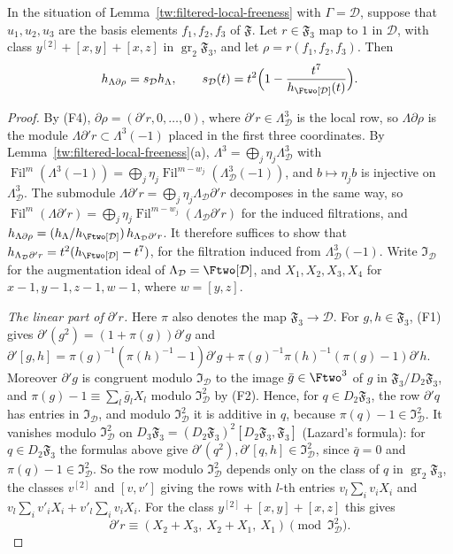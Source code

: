 \begin{lemma}\label{tw:local-fox}
In the situation of Lemma~\ref{tw:filtered-local-freeness} with $\Gamma=\mathcal D$,
suppose that $u_1,u_2,u_3$ are the basis elements $f_1,f_2,f_3$ of
$\mathfrak F$. Let $r\in\mathfrak F_3$ map to $1$ in $\mathcal D$, with class
$y^{[2]}+[x,y]+[x,z]$ in $\operatorname{gr}_2\mathfrak F_3$, and let
$\rho=r(f_1,f_2,f_3)$. Then
\[
 h_{\Lambda\partial\rho}=s_{\mathcal D}h_\Lambda,\qquad
 s_{\mathcal D}(t)=t^2\Bigl(1-\frac{t^7}{h_{\Ftwo[\mathcal D]}(t)}\Bigr).
\]
\end{lemma}

\begin{proof}
By (F4), $\partial\rho=(\partial'r,0,\dots,0)$, where
$\partial'r\in\Lambda_{\mathcal D}^3$ is the local row, so $\Lambda\partial\rho$ is the
module $\Lambda\partial'r\subset\Lambda^3(-1)$ placed in the first three
coordinates. By Lemma~\ref{tw:filtered-local-freeness}(a),
$\Lambda^3=\bigoplus_j\eta_j\Lambda_{\mathcal D}^3$ with
$\operatorname{Fil}^m(\Lambda^3(-1))=\bigoplus_j\eta_j\operatorname{Fil}^{m-w_j}(\Lambda_{\mathcal D}^3(-1))$,
and
$b\mapsto\eta_jb$ is injective on $\Lambda_{\mathcal D}^3$. The submodule
$\Lambda\partial'r=\bigoplus_j\eta_j\Lambda_{\mathcal D}\partial'r$ decomposes in the
same way, so
$\operatorname{Fil}^m(\Lambda\partial'r)=\bigoplus_j\eta_j\operatorname{Fil}^{m-w_j}(\Lambda_{\mathcal D}\partial'r)$
for
the induced filtrations, and
$h_{\Lambda\partial\rho}=(h_\Lambda/h_{\Ftwo[\mathcal D]})\,h_{\Lambda_{\mathcal D}\partial'r}$. It
therefore suffices to show that $h_{\Lambda_{\mathcal D}\partial'r}=t^2(h_{\Ftwo[\mathcal D]}-t^7)$, for
the filtration induced from $\Lambda_{\mathcal D}^3(-1)$. Write $\mathfrak I_{\mathcal D}$ for the augmentation ideal of
$\Lambda_{\mathcal D}=\Ftwo[\mathcal D]$, and $X_1,X_2,X_3,X_4$ for $x-1,y-1,z-1,w-1$, where
$w=[y,z]$.

\emph{The linear part of $\partial'r$.} Here $\pi$ also denotes the map
$\mathfrak F_3\to \mathcal D$. For $g,h\in\mathfrak F_3$, (F1) gives
$\partial'(g^2)=(1+\pi(g))\partial'g$ and
$\partial'[g,h]=\pi(g)^{-1}(\pi(h)^{-1}-1)\partial'g+\pi(g)^{-1}\pi(h)^{-1}(\pi(g)-1)\partial'h$.
Moreover $\partial'g$ is congruent modulo $\mathfrak I_{\mathcal D}$ to the image
$\bar g\in\Ftwo^3$ of $g$ in $\mathfrak F_3/D_2\mathfrak F_3$, and
$\pi(g)-1\equiv\sum_l\bar g_lX_l$ modulo $\mathfrak I_{\mathcal D}^2$ by (F2). Hence, for
$q\in D_2\mathfrak F_3$, the row $\partial'q$ has entries in $\mathfrak I_{\mathcal D}$,
and modulo $\mathfrak I_{\mathcal D}^2$ it is additive in $q$, because
$\pi(q)-1\in\mathfrak I_{\mathcal D}^2$. It vanishes modulo $\mathfrak I_{\mathcal D}^2$ on
$D_3\mathfrak F_3=(D_2\mathfrak F_3)^2[D_2\mathfrak F_3,\mathfrak F_3]$ (Lazard's
formula): for $q\in D_2\mathfrak F_3$ the formulas above give
$\partial'(q^2),\partial'[q,h]\in\mathfrak I_{\mathcal D}^2$, since $\bar q=0$ and
$\pi(q)-1\in\mathfrak I_{\mathcal D}^2$. So the row modulo $\mathfrak I_{\mathcal D}^2$ depends
only on the class of $q$ in $\operatorname{gr}_2\mathfrak F_3$, the classes
$v^{[2]}$ and $[v,v']$ giving the rows with $l$-th entries $v_l\sum_iv_iX_i$
and $v_l\sum_iv'_iX_i+v'_l\sum_iv_iX_i$.
For the class $y^{[2]}+[x,y]+[x,z]$ this gives
\[
 \partial'r\equiv(X_2+X_3,\ X_2+X_1,\ X_1)\pmod{\mathfrak I_{\mathcal D}^2}.
\]


\end{proof}
